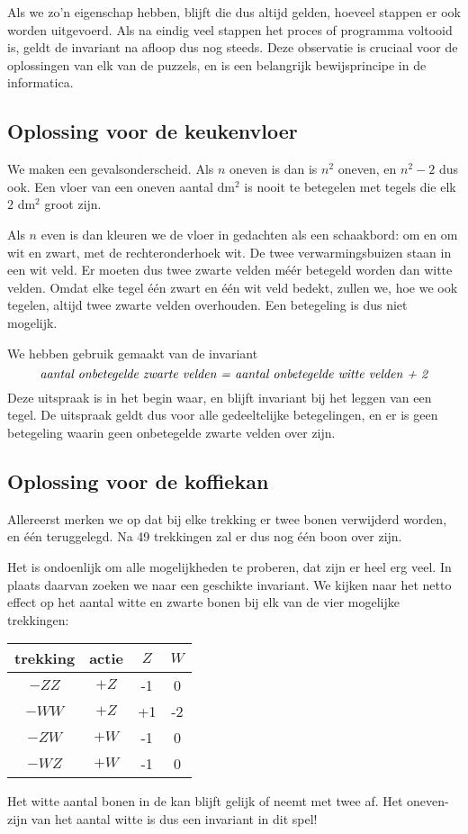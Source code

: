 Als we zo'n eigenschap hebben, blijft die dus altijd gelden, hoeveel stappen er ook worden uitgevoerd. Als na eindig veel stappen het proces of programma voltooid is, geldt de invariant na afloop dus nog steeds. Deze observatie is cruciaal voor de oplossingen van elk van de puzzels, en is een belangrijk bewijsprincipe in de informatica.

\subsection*{Oplossing voor de keukenvloer}
We maken een gevalsonderscheid. Als $n$ oneven is dan is $n^2$ oneven, en $n^2-2$ dus ook. Een vloer van een oneven aantal dm$^2$ is nooit te betegelen met tegels die elk $2$ dm$^2$ groot zijn.

Als $n$ even is dan kleuren we de vloer in gedachten als een schaakbord: om en om wit en zwart, met de rechteronderhoek wit. De twee verwarmingsbuizen staan in een wit veld. Er moeten dus twee zwarte velden m\'e\'er betegeld worden dan witte velden. Omdat elke tegel \'e\'en zwart en \'e\'en wit veld bedekt, zullen we, hoe we ook tegelen, altijd twee zwarte velden overhouden. Een betegeling is dus niet mogelijk.

We hebben gebruik gemaakt van de invariant
$$\text{\it aantal onbetegelde zwarte velden = aantal onbetegelde witte velden + 2}$$
Deze uitspraak is in het begin waar, en blijft invariant bij het leggen van een tegel. De uitspraak geldt dus voor alle gedeeltelijke betegelingen, en er is geen betegeling waarin geen onbetegelde zwarte velden over zijn.

\subsection*{Oplossing voor de koffiekan}
Allereerst merken we op dat bij elke trekking er twee bonen verwijderd worden, en \'e\'en teruggelegd. Na 49 trekkingen zal er dus nog \'e\'en boon over zijn.

Het is ondoenlijk om alle mogelijkheden te proberen, dat zijn er heel erg veel. In plaats daarvan zoeken we naar een geschikte invariant. We kijken naar het netto effect op het aantal witte en zwarte bonen bij elk van de vier mogelijke trekkingen:
\begin{center}
    \begin{tabular}{|cc|cc|}
    \hline
    trekking & actie & $Z$ & $W$ \\
    \hline
    $-ZZ$ & $+Z$ & -1 & 0\\
    $-WW$ & $+Z$ & +1 & -2\\
    $-ZW$ & $+W$ & -1 & 0\\
    $-WZ$ & $+W$ & -1 & 0\\
    \hline
    \end{tabular}
\end{center}
Het witte aantal bonen in de kan blijft gelijk of neemt met twee af. Het oneven-zijn van het aantal witte is dus een invariant in dit spel!

